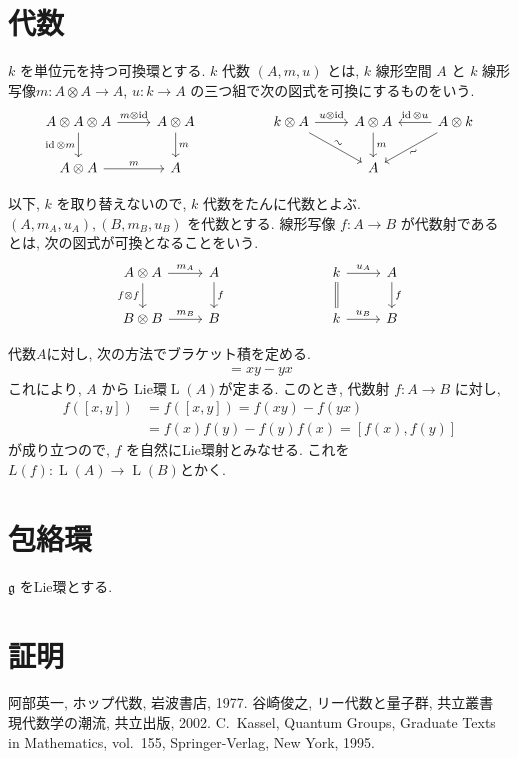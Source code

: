 \documentclass[12pt, a4paper, dvipdfmx]{jsarticle}
\theoremstyle{definition}
\newcommand{\id}{\mathop{\mathrm{id}}\nolimits} %
\numberwithin{equation}{section} %
\newcommand{\gG}{\mathfrak{g}}
\newcommand{\lL}{\mathop{\mathrm{L}}\nolimits}
\begin{document}
\section{代数}

$k$ を単位元を持つ可換環とする. 
$k$ 代数 $(A, m, u)$ とは, $k$ 線形空間 $A$ と
$k$ 線形写像$m: A\otimes A\to A$, 
$u: k \to A$
の三つ組で次の図式を可換にするものをいう. 
\[
\begin{tikzcd} 
A \otimes A \otimes A
\arrow[r, "{m\otimes \id}"] 
\arrow["{\id \otimes m}"',d] 
& 
A \otimes A 
\arrow[d, "m"] 
& & 
k \otimes A 
\arrow[r, "u\otimes \id"] 
\arrow[dr, "\sim" sloped] 
& 
A \otimes A 
\arrow[d, "m"] 
& 
A \otimes k
\arrow[l, "\id \otimes u"']
\arrow[dl, "\sim"' sloped]\\ 
A \otimes A 
\arrow[r, "m"] 
& 
A 
& & &
A 
\end{tikzcd}
\]

以下, $k$ を取り替えないので, 
$k$ 代数をたんに代数とよぶ. 
$(A,m_A,u_A), (B,m_B,u_B)$ を代数とする. 
線形写像 $f:A\to B$ が代数射であるとは, 
次の図式が可換となることをいう. 
\[
    \begin{tikzcd}
        A\otimes A
        \arrow[r, "m_A"]
        \arrow[d, "f\otimes f"']
        & 
        A
        \arrow[d, "f"]
        & & &%
        k
        \arrow[r, "u_A"]\arrow[d, equals]
        &
        A
        \arrow[d, "f"]\\%
        B\otimes B
        \arrow[r,"m_B"]
        &
        B
        & & &%
        k
        \arrow[r,"u_B"]
        &
        B
    \end{tikzcd}
\]

代数$A$に対し, 次の方法でブラケット積を定める. 
\begin{align}
    [x,y] = xy - yx \label{bracket}    
\end{align}
これにより, $A$ から Lie環$\lL(A)$が定まる. 
このとき, 代数射 $f: A \to B$
に対し, 
\begin{align*}
    f([x,y]) 
    &= f([x,y]) = f(xy) - f(yx)\\
    &= f(x)f(y) - f(y)f(x)
    = [f(x), f(y)]
\end{align*}
が成り立つので, $f$ を自然にLie環射とみなせる. 
これを$L(f):\lL(A) \to \lL(B)$とかく. 

\section{包絡環}
$\gG$ をLie環とする. 

\section{証明}



\begin{thebibliography}{20}
\par
   阿部英一, ホップ代数, 岩波書店, 1977.
   谷崎俊之, リー代数と量子群, 共立叢書　現代数学の潮流, 共立出版, 2002.
   C.\ Kassel, Quantum Groups, 
  Graduate Texts in Mathematics, 
  vol.\ 155, Springer-Verlag, New York, 1995.
\end{thebibliography}
\end{document}
